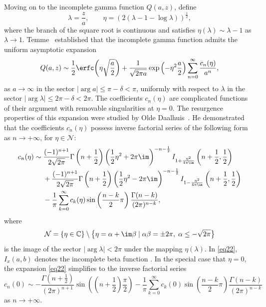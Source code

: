 Moving on to the incomplete gamma function $Q(a,z)$, define
\[
\lambda = \frac{z}{a},\qquad \eta = (2(\lambda - 1 - \log \lambda ))^{\frac{1}{2}} ,
\]
where the branch of the square root is continuous and satisfies $\eta(\lambda)\sim \lambda-1$ as $\lambda\to 1$. Temme~\cite{Temme1979} established that the incomplete gamma function admits the uniform asymptotic expansion
\begin{equation}\label{eq23}
Q(a,z) \sim \frac{1}{2}\erfc\bigg( \eta \sqrt{\frac{a}{2}} \bigg) + \frac{1}{\sqrt{2\pi a} }\exp \left(- \eta ^2 \frac{a}{2}\right)\sum_{n = 0}^\infty \frac{c_n (\eta )}{a^n},
\end{equation}
as $a\to \infty$ in the sector $|\arg a| \le \pi-\delta<\pi$, uniformly with respect to $\lambda$ in the sector $|\arg \lambda| \le 2\pi-\delta<2\pi$. The coefficients $c_n (\eta )$ are complicated functions of their argument with removable singularities at $\eta=0$. The resurgence properties of this expansion were studied by Olde Daalhuis~\cite{OldeDaalhuis1998a}. He demonstrated that the coefficients $c_n (\eta)$ possess inverse factorial series of the following form as $n\to+\infty$, for $\eta \in \mathcal{N}$:
\begin{gather}\label{eq22}
\begin{split}
c_n (\eta ) \sim \; & \frac{( - 1)^{n + 1} }{2\sqrt {2\pi }}\Gamma \left( n + \frac{1}{2} \right)\left( \frac{1}{2}\eta ^2 + 2\pi \im \right)^{ - n - \frac{1}{2}} I_{1 + \frac{\eta ^2 }{4\pi \im}} \left( n + \frac{1}{2},\frac{1}{2} \right)
\\ & + \frac{( - 1)^{n + 1} }{2\sqrt {2\pi } }\Gamma \left( n + \frac{1}{2} \right)\left( \frac{1}{2}\eta ^2 - 2\pi \im \right)^{ - n - \frac{1}{2}} I_{1 - \frac{\eta ^2 }{4\pi \im}} \left( n + \frac{1}{2},\frac{1}{2} \right)
\\ & - \frac{1}{\pi}\sum_{k = 0}^\infty c_k (\eta )\sin \left( \frac{n - k}{2}\pi \right)\frac{\Gamma (n - k)}{(2\pi )^{n - k} },
\end{split}
\end{gather}
where
\[
\mathcal{N} = \left\{ \eta \in \mathbb{C} \right\}\setminus \big\{ \eta = \alpha + \im \beta \mid \alpha \beta = \pm 2\pi ,\; \alpha \le - \sqrt {2\pi}\big\}
\]
is the image of the sector $|\arg \lambda|<2\pi$ under the mapping $\eta(\lambda)$. In \eqref{eq22}, $I_x(a,b)$ denotes the incomplete beta function \cite[Section~8.17]{DLMF}. In the special case that $\eta=0$, the expansion \eqref{eq22} simplifies to the inverse factorial series
\begin{equation}\label{eq19}
c_n (0) \sim -\frac{\Gamma \left( n + \frac{1}{2} \right)}{(2\pi )^{n + 1}}\sin\left( \left( n + \frac{1}{2} \right)\frac{\pi}{2} \right) - \frac{1}{\pi}\sum_{k = 0}^\infty c_k (0)\sin \left( \frac{n - k}{2}\pi \right)\frac{\Gamma (n - k)}{(2\pi )^{n - k} }
\end{equation}
as $n\to+\infty$.

